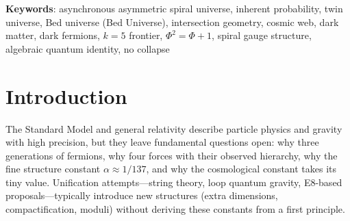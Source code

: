 \documentclass[12pt,a4paper]{article}
\newcommand{\bed}{Bed universe}
\begin{document}
\begin{abstract}
The twin universes' full lifecycle---from the persistent singularity ($>55\%$ of $Z(k)$ at every $k$) through dimensional emergence---from the First Breath ($k = 0$, a pre-dimensional singularity with degenerate modes, through continuous emergence during $\beta \in (0,1)$) to $k = 5$ in $\sim 6 \times 10^{-43}$~s---to the \emph{Kiss} at $z_{\mathrm{kiss}} = 1/\varphi \approx 0.618$---is rigorously derived. All Kiss-epoch parameters are computed in exact $\mathbb{Q}(\varphi)$ algebraic form before numerical evaluation, yielding $\Omega_\Lambda = \varphi^3/(2{+}\varphi^3) = 0.6793$, $\Omega_m = 2/(2{+}\varphi^3) = 0.3207$ (each within $0.8\sigma$ of Planck), $w_0 = -1 + 1/\varphi^2 - 2/L_6 = -0.729$ (O1, $0.03\sigma$), CKM first-row unitarity $1 - 1/(L_4{+}L_6)^2 = 0.99840$ ($0.00\sigma$), and an age $T_0 = 13.80$ Gyr (O1, $0.1\sigma$); throughout, error is quoted in units of the experimental standard deviation $\sigma$. The algebraic closure $\Omega_\Lambda + \Omega_m = 1$ and the $2{:}1$ energy partition at the Kiss hold exactly. Dark energy is the residual of the initial conditions ($\rho_\Lambda/\rho_P = e^{-281}$, within 0.9 decades on a 123-decade span). The speed of light is the intrinsic rate of the iteration.
\end{abstract}

\noindent\textbf{Keywords}: asynchronous asymmetric spiral universe, inherent probability, twin universe, \bed{} (Bed Universe), intersection geometry, cosmic web, dark matter, dark fermions, $k{=}5$ frontier, $\Phi^2{=}\Phi{+}1$, spiral gauge structure, algebraic quantum identity, no collapse

\newpage

\section*{Introduction}
\label{sec:intro}

The Standard Model and general relativity describe particle physics and gravity with high precision, but they leave fundamental questions open: why three generations of fermions, why four forces with their observed hierarchy, why the fine structure constant $\alpha \approx 1/137$, and why the cosmological constant takes its tiny value. Unification attempts---string theory, loop quantum gravity, E8-based proposals---typically introduce new structures (extra dimensions, compactification, moduli) without deriving these constants from a first principle.
\end{document}
